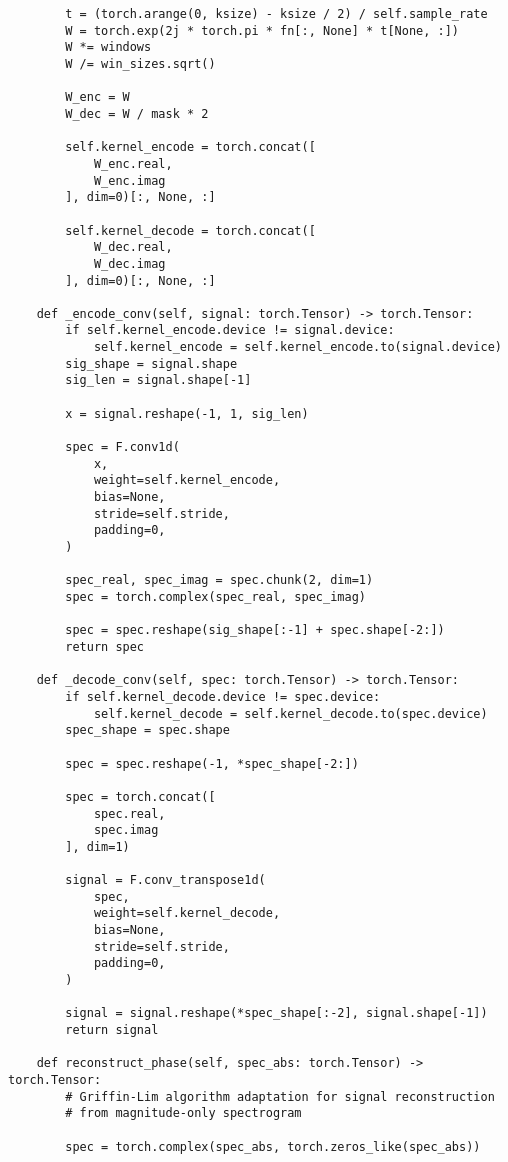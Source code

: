 \begin{verbatim}
        t = (torch.arange(0, ksize) - ksize / 2) / self.sample_rate
        W = torch.exp(2j * torch.pi * fn[:, None] * t[None, :])
        W *= windows
        W /= win_sizes.sqrt()

        W_enc = W
        W_dec = W / mask * 2

        self.kernel_encode = torch.concat([
            W_enc.real,
            W_enc.imag
        ], dim=0)[:, None, :]

        self.kernel_decode = torch.concat([
            W_dec.real,
            W_dec.imag
        ], dim=0)[:, None, :]

    def _encode_conv(self, signal: torch.Tensor) -> torch.Tensor:
        if self.kernel_encode.device != signal.device:
            self.kernel_encode = self.kernel_encode.to(signal.device)
        sig_shape = signal.shape
        sig_len = signal.shape[-1]

        x = signal.reshape(-1, 1, sig_len)

        spec = F.conv1d(
            x, 
            weight=self.kernel_encode, 
            bias=None, 
            stride=self.stride,
            padding=0,
        )

        spec_real, spec_imag = spec.chunk(2, dim=1)
        spec = torch.complex(spec_real, spec_imag)

        spec = spec.reshape(sig_shape[:-1] + spec.shape[-2:])
        return spec
    
    def _decode_conv(self, spec: torch.Tensor) -> torch.Tensor:
        if self.kernel_decode.device != spec.device:
            self.kernel_decode = self.kernel_decode.to(spec.device)
        spec_shape = spec.shape

        spec = spec.reshape(-1, *spec_shape[-2:])

        spec = torch.concat([
            spec.real,
            spec.imag
        ], dim=1)

        signal = F.conv_transpose1d(
            spec, 
            weight=self.kernel_decode, 
            bias=None, 
            stride=self.stride,
            padding=0,
        )

        signal = signal.reshape(*spec_shape[:-2], signal.shape[-1])
        return signal
    
    def reconstruct_phase(self, spec_abs: torch.Tensor) -> torch.Tensor:
        # Griffin-Lim algorithm adaptation for signal reconstruction 
        # from magnitude-only spectrogram

        spec = torch.complex(spec_abs, torch.zeros_like(spec_abs))
        

\end{verbatim}
